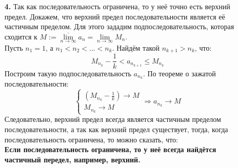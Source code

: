 \documentclass[a4paper]{article}
\renewcommand{\f}[2]{\frac{#1}{#2}}
\newcommand{\case}[1]{\begin{cases} #1 \end{cases}}
\newcommand{\lm}[1]{\lim\limits_{#1}}
\renewcommand{\r}{\Rightarrow}
\renewcommand{\leq}{\leqslant}
\begin{document}
\begin{enumerate}
    \item[\textbf{4.}]Так как последовательность ограничена, то у неё точно есть верхний предел.
     Докажем, что верхний предел последовательности является её частичным пределом.
     Для этого зададим подпоследовательность, которая сходится к $ M := \overline{\lm{n \to \infty}}a_n = \lm{n \to \infty}M_n$.\\
     Пусть $n_1 = 1$, а $n_1 < n_2 < \dots < n_k$. Найдём такой $n_{k+1} > n_k$, что:
     $$M_{n_k} - \f{1}{k} < a_{n_{k+1}} \leq M_{n_k}$$ 
     Построим такую подпоследовательность $a_{n_k}$. По теореме о зажатой последовательности:
     $$\case{
        (M_{n_k} - \f{1}{k}) \to M\\
        M_{n_k} \to M
     } \r a_{n_k} \to M$$
     Следовательно, верхний предел всегда является частичным пределом последовательности, а так как верхний предел существует, тогда, когда последовательность ограничена, то можно сказать, что:\\
     \textbf{Если последовательность ограничена, то у неё всегда найдётся частичный передел, например, верхний.}

\end{enumerate}
\end{document}
